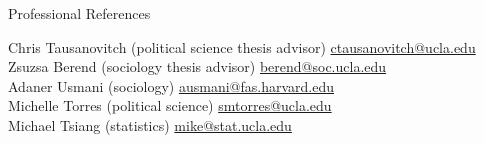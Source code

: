 \documentclass[
	12pt, %
]{resume} %
\begin{document}
\begin{rSection}{Professional References}

Chris Tausanovitch (political science thesis advisor) \hfill \href{mailto:ctausanovitch@ucla.edu}{ctausanovitch@ucla.edu}\\
Zsuzsa Berend (sociology thesis advisor) \hfill \href{mailto:berend@soc.ucla.edu}{berend@soc.ucla.edu}\\
Adaner Usmani (sociology) \hfill \href{mailto:ausmani@fas.harvard.edu}{ausmani@fas.harvard.edu}\\
Michelle Torres (political science) \hfill \href{mailto:smtorres@ucla.edu}{smtorres@ucla.edu}\\
Michael Tsiang (statistics) \hfill \href{mailto:mike@stat.ucla.edu}{mike@stat.ucla.edu}
\end{rSection}

\end{document}
